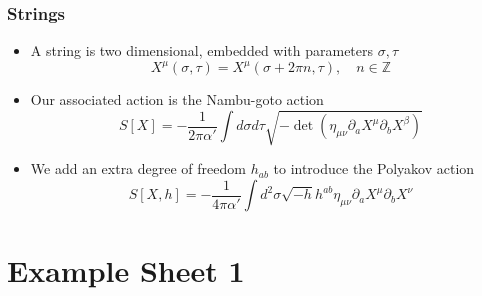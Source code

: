 \documentclass[11pt, oneside]{article}   	%
\theoremstyle{slanted}
\begin{document}
\subsubsection*{Strings}
\begin{itemize}
	\item A string is two dimensional, 
		embedded with parameters $ \sigma, \tau $
		\[
			X^ \mu  \left( \sigma, \tau  \right)   = X^ \mu 
			\left(  \sigma + 2 \pi n , \tau  \right) , \quad 
			n \in \mathbb{ Z } 
		\]
	\item Our associated action is the Nambu-goto action 
	\[
		S[X] =  - \frac{1}{ 2 \pi \alpha ' }\int d \sigma d \tau 
		\sqrt{  - \det\left( \eta_{ \mu \nu } 
		\partial  _ a X ^ \mu \partial  _ b X ^ \beta \right) } 
	\] 
\item We add an extra degree of freedom $ h _{ ab } $ to introduce 
	the Polyakov action 
	\[
	 S[X, h ] = - \frac{1}{4 \pi \alpha ' } 
	 \int d ^ 2 \sigma \sqrt{  - h }  h ^{ ab } \eta _{ \mu \nu } 
	 \partial  _ a X ^ \mu \partial  _ b X ^ \nu 
	\]  
\end{itemize}

\section*{Example Sheet 1}

 
\end{document}
